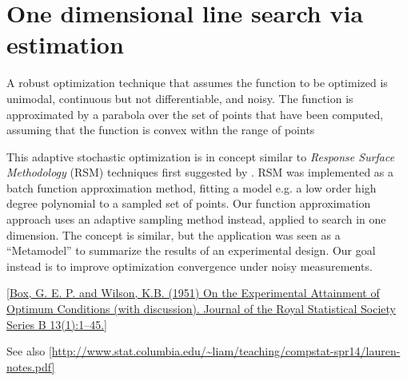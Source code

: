 \section*{One dimensional line search via estimation}
 
 A robust optimization technique that assumes the function to be optimized 
 is unimodal, continuous but not differentiable, and noisy. The function is approximated 
 by a parabola over the set of points that have been computed, assuming that the 
 function is convex withn the range of points

This adaptive stochastic optimization is in concept similar to \emph{Response Surface Methodology} (RSM) techniques first suggested by \cite{?}. RSM was implemented as a batch function approximation method, fitting a model e.g. a low order high degree polynomial to a sampled set of points. Our function approximation approach uses an adaptive sampling method instead, applied to search in one dimension. The concept is similar, but the application was seen as a ``Metamodel'' to summarize the results of an experimental design. Our goal instead is to improve optimization convergence under noisy measurements. 

\ref{Box, G. E. P. and Wilson, K.B. (1951) On the Experimental Attainment of Optimum Conditions (with discussion). Journal of the Royal Statistical Society Series B 13(1):1–45.}

See also 
\ref{http://www.stat.columbia.edu/~liam/teaching/compstat-spr14/lauren-notes.pdf}